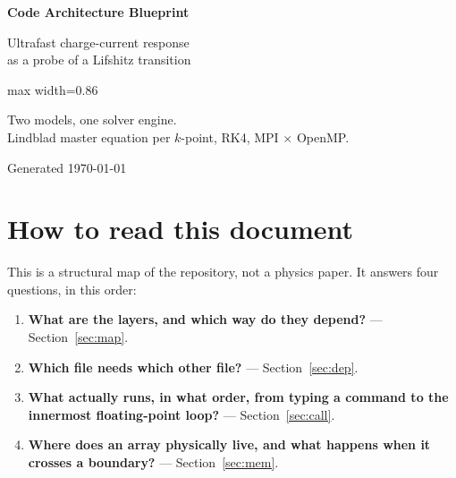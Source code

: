 \documentclass[11pt,a4paper]{article}
\begin{document}
\begin{titlepage}
\centering
\vspace*{3.2cm}
{\Huge\bfseries\sffamily\color{Slate} Code Architecture Blueprint\par}
\vspace{6mm}
{\Large\sffamily Ultrafast charge-current response\\[2mm]
as a probe of a Lifshitz transition\par}
\vspace{10mm}

\vspace{16mm}

\begin{adjustbox}{max width=0.86\textwidth}
\end{adjustbox}

\vfill
{\sffamily\small Two models, one solver engine.\\
Lindblad master equation per $k$-point, RK4, MPI $\times$ OpenMP.\par}
\vspace{4mm}
{\sffamily\footnotesize\color{Slate} Generated \today\par}
\end{titlepage}

\tableofcontents
\newpage

\section{How to read this document}

This is a structural map of the repository, not a physics paper. It answers four
questions, in this order:

\begin{enumerate}
  \item \textbf{What are the layers, and which way do they depend?} --- Section~\ref{sec:map}.
  \item \textbf{Which file needs which other file?} --- Section~\ref{sec:dep}.
  \item \textbf{What actually runs, in what order, from typing a command to the
        innermost floating-point loop?} --- Section~\ref{sec:call}.
  \item \textbf{Where does an array physically live, and what happens when it
        crosses a boundary?} --- Section~\ref{sec:mem}.
\end{enumerate}
\end{document}
